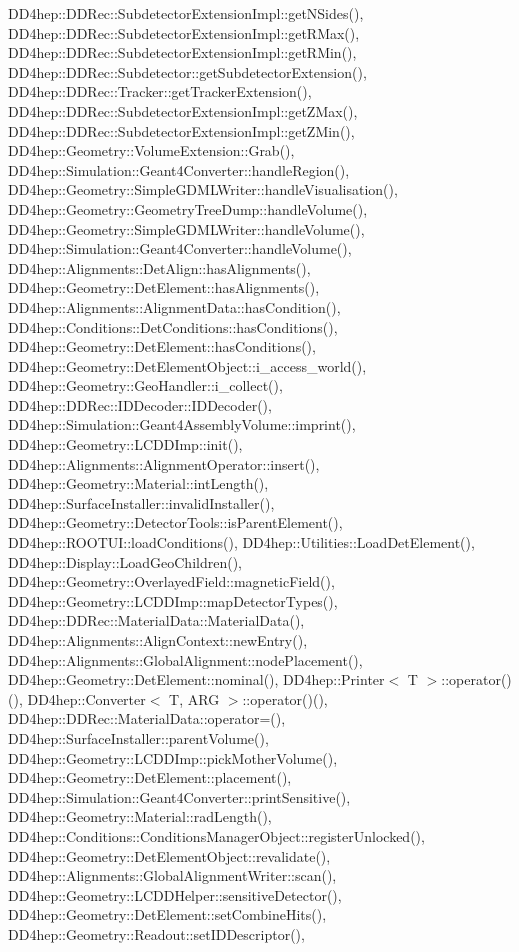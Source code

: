 D\+D4hep\+::\+D\+D\+Rec\+::\+Subdetector\+Extension\+Impl\+::get\+N\+Sides(), D\+D4hep\+::\+D\+D\+Rec\+::\+Subdetector\+Extension\+Impl\+::get\+R\+Max(), D\+D4hep\+::\+D\+D\+Rec\+::\+Subdetector\+Extension\+Impl\+::get\+R\+Min(), D\+D4hep\+::\+D\+D\+Rec\+::\+Subdetector\+::get\+Subdetector\+Extension(), D\+D4hep\+::\+D\+D\+Rec\+::\+Tracker\+::get\+Tracker\+Extension(), D\+D4hep\+::\+D\+D\+Rec\+::\+Subdetector\+Extension\+Impl\+::get\+Z\+Max(), D\+D4hep\+::\+D\+D\+Rec\+::\+Subdetector\+Extension\+Impl\+::get\+Z\+Min(), D\+D4hep\+::\+Geometry\+::\+Volume\+Extension\+::\+Grab(), D\+D4hep\+::\+Simulation\+::\+Geant4\+Converter\+::handle\+Region(), D\+D4hep\+::\+Geometry\+::\+Simple\+G\+D\+M\+L\+Writer\+::handle\+Visualisation(), D\+D4hep\+::\+Geometry\+::\+Geometry\+Tree\+Dump\+::handle\+Volume(), D\+D4hep\+::\+Geometry\+::\+Simple\+G\+D\+M\+L\+Writer\+::handle\+Volume(), D\+D4hep\+::\+Simulation\+::\+Geant4\+Converter\+::handle\+Volume(), D\+D4hep\+::\+Alignments\+::\+Det\+Align\+::has\+Alignments(), D\+D4hep\+::\+Geometry\+::\+Det\+Element\+::has\+Alignments(), D\+D4hep\+::\+Alignments\+::\+Alignment\+Data\+::has\+Condition(), D\+D4hep\+::\+Conditions\+::\+Det\+Conditions\+::has\+Conditions(), D\+D4hep\+::\+Geometry\+::\+Det\+Element\+::has\+Conditions(), D\+D4hep\+::\+Geometry\+::\+Det\+Element\+Object\+::i\+\_\+access\+\_\+world(), D\+D4hep\+::\+Geometry\+::\+Geo\+Handler\+::i\+\_\+collect(), D\+D4hep\+::\+D\+D\+Rec\+::\+I\+D\+Decoder\+::\+I\+D\+Decoder(), D\+D4hep\+::\+Simulation\+::\+Geant4\+Assembly\+Volume\+::imprint(), D\+D4hep\+::\+Geometry\+::\+L\+C\+D\+D\+Imp\+::init(), D\+D4hep\+::\+Alignments\+::\+Alignment\+Operator\+::insert(), D\+D4hep\+::\+Geometry\+::\+Material\+::int\+Length(), D\+D4hep\+::\+Surface\+Installer\+::invalid\+Installer(), D\+D4hep\+::\+Geometry\+::\+Detector\+Tools\+::is\+Parent\+Element(), D\+D4hep\+::\+R\+O\+O\+T\+U\+I\+::load\+Conditions(), D\+D4hep\+::\+Utilities\+::\+Load\+Det\+Element(), D\+D4hep\+::\+Display\+::\+Load\+Geo\+Children(), D\+D4hep\+::\+Geometry\+::\+Overlayed\+Field\+::magnetic\+Field(), D\+D4hep\+::\+Geometry\+::\+L\+C\+D\+D\+Imp\+::map\+Detector\+Types(), D\+D4hep\+::\+D\+D\+Rec\+::\+Material\+Data\+::\+Material\+Data(), D\+D4hep\+::\+Alignments\+::\+Align\+Context\+::new\+Entry(), D\+D4hep\+::\+Alignments\+::\+Global\+Alignment\+::node\+Placement(), D\+D4hep\+::\+Geometry\+::\+Det\+Element\+::nominal(), D\+D4hep\+::\+Printer$<$ T $>$\+::operator()(), D\+D4hep\+::\+Converter$<$ T, A\+R\+G $>$\+::operator()(), D\+D4hep\+::\+D\+D\+Rec\+::\+Material\+Data\+::operator=(), D\+D4hep\+::\+Surface\+Installer\+::parent\+Volume(), D\+D4hep\+::\+Geometry\+::\+L\+C\+D\+D\+Imp\+::pick\+Mother\+Volume(), D\+D4hep\+::\+Geometry\+::\+Det\+Element\+::placement(), D\+D4hep\+::\+Simulation\+::\+Geant4\+Converter\+::print\+Sensitive(), D\+D4hep\+::\+Geometry\+::\+Material\+::rad\+Length(), D\+D4hep\+::\+Conditions\+::\+Conditions\+Manager\+Object\+::register\+Unlocked(), D\+D4hep\+::\+Geometry\+::\+Det\+Element\+Object\+::revalidate(), D\+D4hep\+::\+Alignments\+::\+Global\+Alignment\+Writer\+::scan(), D\+D4hep\+::\+Geometry\+::\+L\+C\+D\+D\+Helper\+::sensitive\+Detector(), D\+D4hep\+::\+Geometry\+::\+Det\+Element\+::set\+Combine\+Hits(), D\+D4hep\+::\+Geometry\+::\+Readout\+::set\+I\+D\+Descriptor(), 